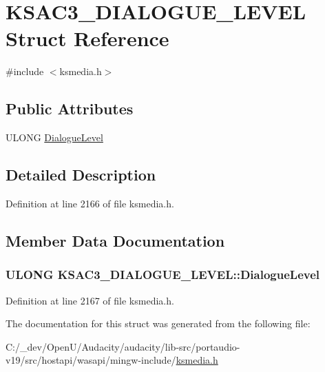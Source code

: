 \hypertarget{struct_k_s_a_c3___d_i_a_l_o_g_u_e___l_e_v_e_l}{}\section{K\+S\+A\+C3\+\_\+\+D\+I\+A\+L\+O\+G\+U\+E\+\_\+\+L\+E\+V\+EL Struct Reference}
\label{struct_k_s_a_c3___d_i_a_l_o_g_u_e___l_e_v_e_l}


{\ttfamily \#include $<$ksmedia.\+h$>$}

\subsection*{Public Attributes}
\begin{DoxyCompactItemize}
\item 
U\+L\+O\+NG \hyperlink{struct_k_s_a_c3___d_i_a_l_o_g_u_e___l_e_v_e_l_a6923908af357f01095d1f32d2890807a}{Dialogue\+Level}
\end{DoxyCompactItemize}


\subsection{Detailed Description}


Definition at line 2166 of file ksmedia.\+h.



\subsection{Member Data Documentation}
\subsubsection[{\texorpdfstring{Dialogue\+Level}{DialogueLevel}}]{\setlength{\rightskip}{0pt plus 5cm}U\+L\+O\+NG K\+S\+A\+C3\+\_\+\+D\+I\+A\+L\+O\+G\+U\+E\+\_\+\+L\+E\+V\+E\+L\+::\+Dialogue\+Level}\hypertarget{struct_k_s_a_c3___d_i_a_l_o_g_u_e___l_e_v_e_l_a6923908af357f01095d1f32d2890807a}{}\label{struct_k_s_a_c3___d_i_a_l_o_g_u_e___l_e_v_e_l_a6923908af357f01095d1f32d2890807a}


Definition at line 2167 of file ksmedia.\+h.



The documentation for this struct was generated from the following file\+:\begin{DoxyCompactItemize}
\item 
C\+:/\+\_\+dev/\+Open\+U/\+Audacity/audacity/lib-\/src/portaudio-\/v19/src/hostapi/wasapi/mingw-\/include/\hyperlink{ksmedia_8h}{ksmedia.\+h}\end{DoxyCompactItemize}
